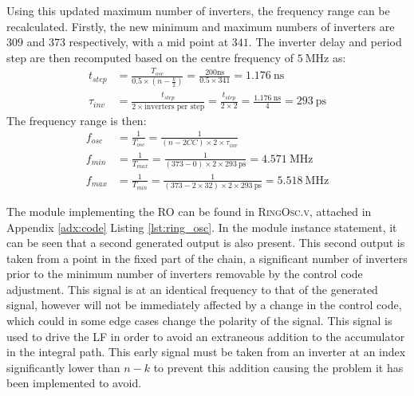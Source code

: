 Using this updated maximum number of inverters, the frequency range can be recalculated. Firstly, the new minimum and maximum numbers of inverters are $309$ and $373$ respectively, with a mid point at $341$. The inverter delay and period step are then recomputed based on the centre frequency of $5~\si{\mega\hertz}$ as:
\begin{align}
t_{step} &= \frac{T_{osc}}{0.5\times(n-\frac{k}{2})} = \frac{200\si{\nano\second}}{0.5\times 341} = 1.176~\si{\nano\second} \\
\tau_{inv} &= \frac{t_{step}}{2\times\text{inverters per step}} = \frac{t_{step}}{2\times2} = \frac{1.176~\si{\nano\second}}{4} = 293~\si{\pico\second}
\end{align}
The frequency range is then:
\begin{align} 
f_{osc} &= \frac{1}{T_{osc}} = \frac{1}{(n-2CC)\times 2\times\tau_{inv}} \\
f_{min} &= \frac{1}{T_{max}} = \frac{1}{(373-0)\times 2\times 293~\si{\pico\second}} = 4.571~\si{\mega\hertz} \\
f_{max} &= \frac{1}{T_{min}} = \frac{1}{(373-2\times32)\times 2\times 293~\si{\pico\second}} = 5.518~\si{\mega\hertz}
\end{align}

The module implementing the \ac{RO} can be found in \textsc{RingOsc.v}, attached in Appendix \ref{adx:code} Listing \ref{lst:ring_osc}. In the module instance statement, it can be seen that a second generated output is also present. This second output is taken from a point in the fixed part of the chain, a significant number of inverters prior to the minimum number of inverters removable by the control code adjustment. This signal is at an identical frequency to that of the generated signal, however will not be immediately affected by a change in the control code, which could in some edge cases change the polarity of the signal. This signal is used to drive the \ac{LF} in order to avoid an extraneous addition to the accumulator in the integral path. This early signal must be taken from an inverter at an index significantly lower than $n-k$ to prevent this addition causing the problem it has been implemented to avoid.

